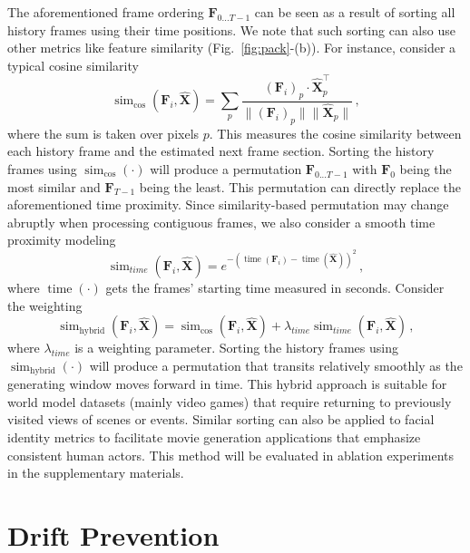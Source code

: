 \documentclass{article}
\begin{document}
The aforementioned frame ordering $\bm{F}_{0...T-1}$ can be seen as a result of sorting all history frames using their time positions. We note that such sorting can also use other metrics like feature similarity (Fig.~\ref{fig:pack}-(b)). For instance, consider a typical cosine similarity
\begin{equation}
\operatorname{sim}_{\cos}(\bm{F}_i, \hat{\bm{X}})=\sum_p\frac{(\bm{F}_i)_p \cdot \hat{\bm{X}}_p^\top}{\|(\bm{F}_i)_p\| \|\hat{\bm{X}}_p\|}\,,
\end{equation}
where the sum is taken over pixels $p$. This measures the cosine similarity between each history frame and the estimated next frame section. Sorting the history frames using $\operatorname{sim}_{\cos}(\cdot)$ will produce a permutation $\bm{F}_{0...T-1}$ with $\bm{F}_0$ being the most similar and $\bm{F}_{T-1}$ being the least. This permutation can directly replace the aforementioned time proximity. Since similarity-based permutation may change abruptly when processing contiguous frames, we also consider a smooth time proximity modeling
\begin{equation}
\operatorname{sim}_{time}(\bm{F}_i, \hat{\bm{X}})=e^{-(\operatorname{time}(\bm{F}_i)-\operatorname{time}(\hat{\bm{X}}))^2}\,,
\end{equation}
where $\operatorname{time}(\cdot)$ gets the frames' starting time measured in seconds. Consider the weighting
\begin{equation}
\operatorname{sim}_\text{hybrid}(\bm{F}_i, \hat{\bm{X}})=\operatorname{sim}_{\cos}(\bm{F}_i, \hat{\bm{X}}) + \lambda_{time}\operatorname{sim}_{time}(\bm{F}_i, \hat{\bm{X}})\,,
\end{equation}
where $\lambda_{time}$ is a weighting parameter. Sorting the history frames using $\operatorname{sim}_\text{hybrid}(\cdot)$ will produce a permutation that transits relatively smoothly as the generating window moves forward in time. This hybrid approach is suitable for world model datasets (mainly video games) that require returning to previously visited views of scenes or events. Similar sorting can also be applied to facial identity metrics to facilitate movie generation applications that emphasize consistent human actors. This method will be evaluated in ablation experiments in the supplementary materials.

\section{Drift Prevention}
\end{document}

